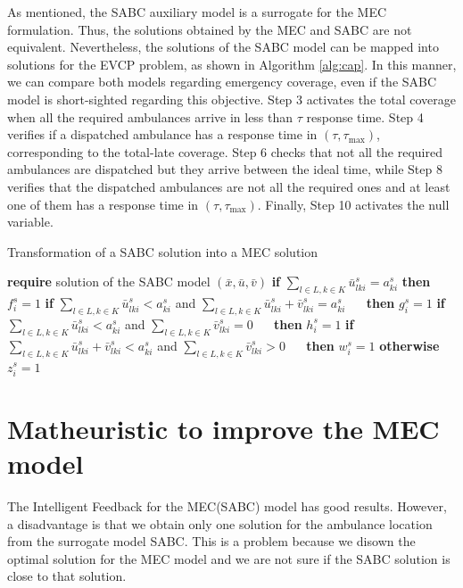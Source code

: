 As mentioned, the SABC auxiliary model is a surrogate for the MEC formulation. Thus, the solutions obtained by the MEC and SABC are not equivalent. Nevertheless, the solutions of the SABC model can be mapped into solutions for the EVCP problem, as shown in Algorithm \ref{alg:cap}. In this manner, we can compare both models regarding emergency coverage, even if the SABC model is short-sighted regarding this objective. 
Step 3 activates the total coverage when all the required ambulances arrive in less than $\tau$ response time. Step 4 verifies if a dispatched ambulance has a response time in $(\tau,\tau_{\max})$, corresponding to the total-late coverage. Step 6 checks that not all the required ambulances are dispatched but they arrive between the ideal time, while Step 8 verifies that the dispatched ambulances are not all the required ones and at least one of them has a response time in $(\tau,\tau_{\max})$. Finally, Step 10 activates the null variable. 
\begin{algorithm}
\caption{Transformation of a SABC solution into a MEC solution }\label{alg:cap}
\begin{algorithmic}[1]
\State \textbf{require} solution of the SABC model $(\bar{x},\bar{u},\bar{v})$
    \State \textbf{if } $\sum_{l\in L,k\in K} \bar{u}^s_{lki}= a^s_{ki}$ \textbf{then}  $f^s_i=1$ 
    \State \textbf{if} $\sum_{l\in L,k\in K} \bar{u}^s_{lki}  < a^s_{ki}$ and $ \sum_{l\in L,k\in K} \bar{u}^s_{lki} +\bar{v}^s_{lki} = a^s_{ki}$ 
    \State $\quad $ \textbf{then} $g^s_i=1$ 
    \State \textbf{if } $ \sum_{l\in L,k\in K} \bar{u}^s_{lki}  < a^s_{ki}$ and $\sum_{l\in L,k\in K}\bar{v}^s_{lki}=0$ 
    \State $\quad $ \textbf{then} $h^s_i=1$ 
    \State \textbf{if} $ \sum_{l\in L,k\in K} \bar{u}^s_{lki} +\bar{v}^s_{lki} < a^s_{ki}$ and $\sum_{l\in L,k\in K}\bar{v}^s_{lki}>0$ 
    \State $\quad $ \textbf{then} $w^s_i=1$ 
    \State \textbf{otherwise} $z^s_i=1$ 
\EndFor
{}
\end{algorithmic}
\end{algorithm}

\section{Matheuristic to improve the MEC model}
The Intelligent Feedback for the MEC(SABC) model has good results. However, a disadvantage is that we obtain only one solution for the ambulance location from the surrogate model SABC. This is a problem because we disown the optimal solution for the MEC model and we are not sure if the SABC solution is close to that solution.

